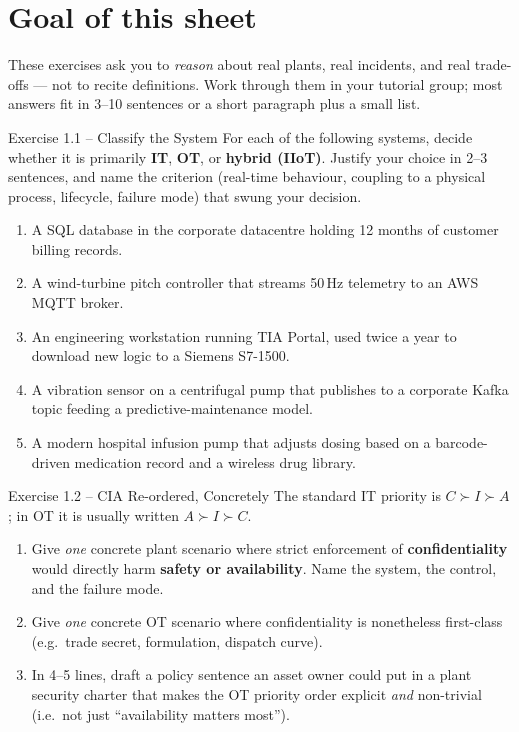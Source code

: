 \documentclass[11pt,a4paper]{article}
\begin{document}
\sheetheader

\section*{Goal of this sheet}
These exercises ask you to \emph{reason} about real plants, real incidents, and real trade-offs --- not to recite definitions. Work through them in your tutorial group; most answers fit in 3--10 sentences or a short paragraph plus a small list.

\begin{taskbox}{Exercise 1.1 -- Classify the System}
For each of the following systems, decide whether it is primarily \textbf{IT}, \textbf{OT}, or \textbf{hybrid (IIoT)}. Justify your choice in 2--3 sentences, and name the criterion (real-time behaviour, coupling to a physical process, lifecycle, failure mode) that swung your decision.
\begin{enumerate}
  \item A SQL database in the corporate datacentre holding 12 months of customer billing records.
  \item A wind-turbine pitch controller that streams 50\,Hz telemetry to an AWS MQTT broker.
  \item An engineering workstation running TIA Portal, used twice a year to download new logic to a Siemens S7-1500.
  \item A vibration sensor on a centrifugal pump that publishes to a corporate Kafka topic feeding a predictive-maintenance model.
  \item A modern hospital infusion pump that adjusts dosing based on a barcode-driven medication record and a wireless drug library.
\end{enumerate}
\end{taskbox}

\begin{taskbox}{Exercise 1.2 -- CIA Re-ordered, Concretely}
The standard IT priority is $C \succ I \succ A$; in OT it is usually written $A \succ I \succ C$.
\begin{enumerate}
  \item Give \emph{one} concrete plant scenario where strict enforcement of \textbf{confidentiality} would directly harm \textbf{safety or availability}. Name the system, the control, and the failure mode.
  \item Give \emph{one} concrete OT scenario where confidentiality is nonetheless first-class (e.g.\ trade secret, formulation, dispatch curve).
  \item In 4--5 lines, draft a policy sentence an asset owner could put in a plant security charter that makes the OT priority order explicit \emph{and} non-trivial (i.e.\ not just ``availability matters most'').
\end{enumerate}
\end{taskbox}
\end{document}
